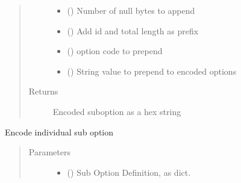 \documentclass[letterpaper,10pt,english]{sphinxmanual}
\begin{document}
\begin{fulllineitems}
\begin{fulllineitems}
\begin{quote}
\begin{description}
\begin{itemize}
\item {} 
\sphinxAtStartPar
{} () \textendash{} Number of null bytes to append

\item {} 
\sphinxAtStartPar
{} () \textendash{} Add id and total length as prefix

\item {} 
\sphinxAtStartPar
{} () \textendash{} option code to prepend

\item {} 
\sphinxAtStartPar
{} () \textendash{} String value to prepend to encoded options

\end{itemize}

\item[{Returns}] \leavevmode
\sphinxAtStartPar
Encoded suboption as a hex string

\end{description}\end{quote}

\end{fulllineitems}


\begin{fulllineitems}
\label{\detokenize{dhcp_encode-class:bloxone.dhcp_encode.encode_sub_option}}
\sphinxAtStartPar
Encode individual sub option
\begin{quote}\begin{description}
\item[{Parameters}] \leavevmode\begin{itemize}
\item {} 
\sphinxAtStartPar
{} () \textendash{} Sub Option Definition, as dict.


\end{itemize}
\end{description}
\end{quote}
\end{fulllineitems}
\end{fulllineitems}
\end{document}
